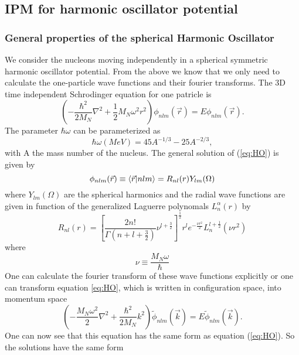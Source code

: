 \documentclass[12pt]{article}
\begin{document}
	
\subsection{IPM for harmonic oscillator potential}
\subsubsection{General properties of the spherical Harmonic Oscillator}
We consider the nucleons moving independently in a spherical symmetric harmonic oscillator potential. From the above we know that we only need to calculate the one-particle wave functions and their fourier transforms. The 3D time independent Schrodinger equation for one patricle is
\begin{equation} \label{eq:HO}
\left( -\frac{\hbar^2}{2M_N} \nabla^2 + \frac{1}{2} M_N \omega^2 r^2 \right) \phi_{nlm}(\vec{r}) = E\phi_{nlm}(\vec{r}).
\end{equation}
The parameter $\hbar\omega$ can be parameterized as
\begin{equation}
\hbar\omega (MeV) = 45A^{-1/3}-25A^{-2/3},
\end{equation}
with A the mass number of the nucleus. The general solution of (\ref{eq:HO}) is given by
\begin{equation}
\phi_{nlm}(\vec{r}) \equiv \braket{\vec{r}|nlm} = R_{nl}(r)Y_{lm}(\Omega)	
\end{equation}
where $Y_{lm}(\Omega)$ are the spherical harmonics and the radial wave functions are given in function of the generalized Laguerre polynomals $L^\alpha_n(r)$ by
\begin{equation}
 R_{nl}(r) = \left[ \frac{2n!}{\Gamma(n+l+\frac{3}{2})}\nu^{l+\frac{3}{2}} \right]^{\frac{1}{2}} r^l e^{-\frac{\nu r^2}{2}} L^{l+\frac{1}{2}}_n(\nu r^2)
\end{equation}
where 
\begin{equation}
\nu \equiv \frac{M_N \omega}{\hbar}
\end{equation}
One can calculate the fourier transform of these wave functions explicitly or one can transform equation \ref{eq:HO}, which is written in configuration space, into momentum space
\begin{equation} \label{eq:HO_momentum}
\left( -\frac{M_N \omega^2}{2} \nabla^2 + \frac{\hbar^2}{2M_N} k^2 \right) \tilde{\phi}_{nlm}(\vec{k}) = E\tilde{\phi}_{nlm}(\vec{k}).
\end{equation}
One can now see that this equation has the same form as equation (\ref{eq:HO}). So the solutions have the same form
\end{document}
